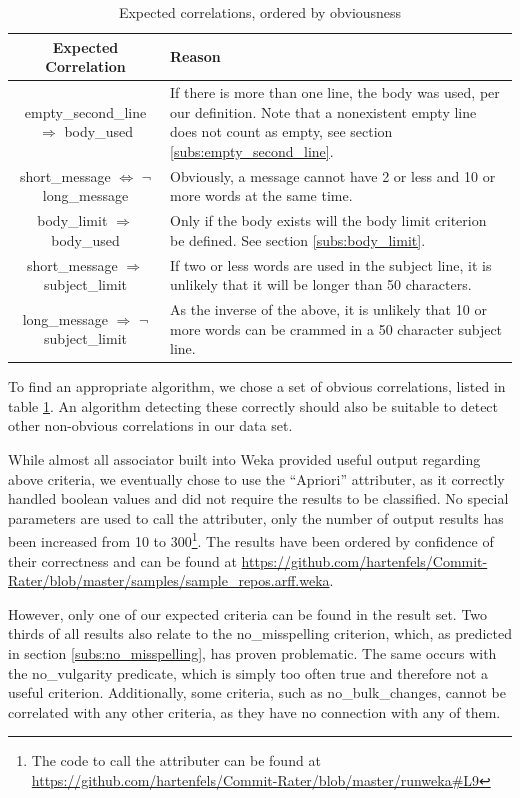 \begin{table}[t]
    \begin{tabularx}{\textwidth}{|c|X|}\hline
        \textbf{Expected Correlation} & \textbf{Reason} \\\hline
        empty\_second\_line $\Rightarrow$ body\_used & If there is more than one line, the body was used, per our definition. Note that a nonexistent empty line does not count as empty, see section \ref{subs:empty_second_line}.\\\hline
        short\_message $\Leftrightarrow$ $\neg$ long\_message & Obviously, a message cannot have 2 or less and 10 or more words at the same time. \\\hline
        body\_limit $\Rightarrow$ body\_used & Only if the body exists will the body limit criterion be defined. See section \ref{subs:body_limit}. \\\hline
        short\_message $\Rightarrow$ subject\_limit & If two or less words are used in the subject line, it is unlikely that it will be longer than 50 characters. \\\hline
        long\_message $\Rightarrow$ $\neg$ subject\_limit & As the inverse of the above, it is unlikely that 10 or more words can be crammed in a 50 character subject line. \\\hline
    \end{tabularx}
    \caption{Expected correlations, ordered by obviousness}
    \label{tab:expect}
\end{table}

To find an appropriate algorithm, we chose a set of obvious correlations, listed in table \ref{tab:expect}. An algorithm detecting these correctly should also be suitable to detect other non-obvious correlations in our data set.

While almost all associator built into Weka provided useful output regarding above criteria, we eventually chose to use the ``Apriori'' attributer\cite{FastWeka,ClassWeka}, as it correctly handled boolean values and did not require the results to be classified. No special parameters are used to call the attributer, only the number of output results has been increased from 10 to 300\footnote{The code to call the attributer can be found at \url{https://github.com/hartenfels/Commit-Rater/blob/master/runweka\#L9}}. The results have been ordered by confidence of their correctness and can be found at \url{https://github.com/hartenfels/Commit-Rater/blob/master/samples/sample\_repos.arff.weka}.

However, only one of our expected criteria can be found in the result set. Two thirds of all results also relate to the no\_misspelling criterion, which, as predicted in section \ref{subs:no_misspelling}, has proven problematic. The same occurs with the no\_vulgarity predicate, which is simply too often true and therefore not a useful criterion. Additionally, some criteria, such as no\_bulk\_changes, cannot be correlated with any other criteria, as they have no connection with any of them.

